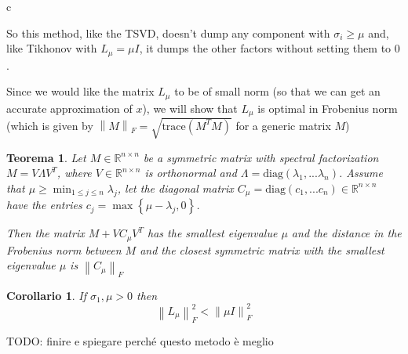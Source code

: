 c\documentclass[a4paper,10pt]{article}
\newcounter{counter1}
\theoremstyle{plain}
\newtheorem{myteo}[counter1]{Teorema}
\newtheorem{mycor}[counter1]{Corollario}
\theoremstyle{definition}
\theoremstyle{remark}
\newcommand{\set}[1]{\left\{#1\right\}}
\newcommand{\pa}[1]{\left(#1\right)}
\newcommand{\norm}[1]{\left\|#1\right\|}
\begin{document}
So this method, like the TSVD, doesn't dump any component with $\sigma
_i \ge \mu$ and, like Tikhonov with $L_\mu = \mu I$, it dumps the
other factors without setting them to $0$.

Since we would like the matrix $L_\mu$ to be of small norm (so that we
can get an accurate approximation of $x$), we will show that $L_\mu$
is optimal in Frobenius norm (which is given by $\norm{M}_F = \sqrt{
  \mathrm{trace} \pa{ M^T M } }$ for a generic matrix $M$)

\begin{myteo}
  Let $M \in \mathbb{R}^{n\times n}$ be a symmetric matrix with
  spectral factorization $M = V \Lambda V^T$, where $V \in
  \mathbb{R}^{n \times n}$ is orthonormal and $\Lambda = \mathrm{diag} \pa{
    \lambda _1, ... \lambda _n}$. Assume that $\mu \ge \min _{1\le
    j\le n} \lambda _j$, let the diagonal matrix $C_\mu = \mathrm{diag}
  \pa{ c_1 , ... c_n}\in \mathbb{R}^{n\times n}$ have the entries $c_j
  = \max \set{\mu - \lambda _j, 0}$.
  
  Then the matrix $M + V C_\mu V^T$ has the smallest eigenvalue $\mu$
  and the distance in the Frobenius norm between $M$ and the closest
  symmetric matrix with the smallest eigenvalue $\mu$ is $\norm{ C_\mu
  }_F$
\end{myteo}

\begin{mycor}
  If $\sigma _1,\mu > 0$ then
  \[ \norm{ L_\mu }^2 _F < \norm{ \mu I} ^2_F \]
\end{mycor}

TODO: finire e spiegare perché questo metodo è meglio


\newpage


\end{document}
